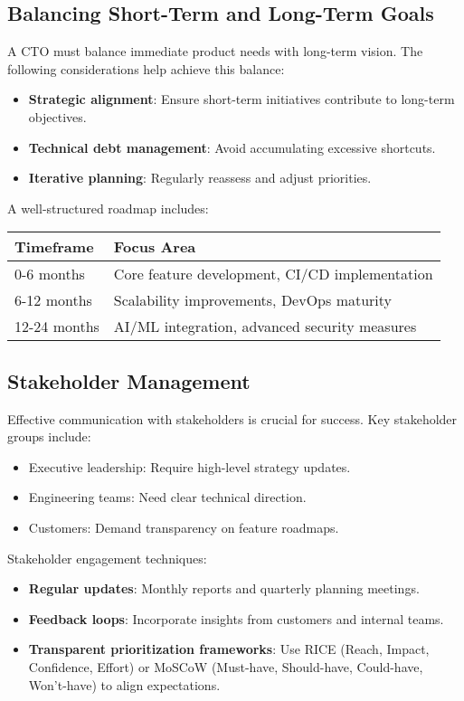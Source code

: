 \subsection{Balancing Short-Term and Long-Term Goals}
A CTO must balance immediate product needs with long-term vision. The following considerations help achieve this balance:

\begin{itemize}
    \item \textbf{Strategic alignment}: Ensure short-term initiatives contribute to long-term objectives.
    \item \textbf{Technical debt management}: Avoid accumulating excessive shortcuts.
    \item \textbf{Iterative planning}: Regularly reassess and adjust priorities.
\end{itemize}
%
A well-structured roadmap includes:\\
%
{\centering
\begin{tabular}{|l|l|}
    \hline
    \textbf{Timeframe} & \textbf{Focus Area}                            \\
    \hline
    0-6 months         & Core feature development, CI/CD implementation \\
    6-12 months        & Scalability improvements, DevOps maturity      \\
    12-24 months       & AI/ML integration, advanced security measures  \\
    \hline
\end{tabular}}

\subsection{Stakeholder Management}
Effective communication with stakeholders is crucial for success. Key stakeholder groups include:

\begin{itemize}
    \item Executive leadership: Require high-level strategy updates.
    \item Engineering teams: Need clear technical direction.
    \item Customers: Demand transparency on feature roadmaps.
\end{itemize}

Stakeholder engagement techniques:
\begin{itemize}
    \item \textbf{Regular updates}: Monthly reports and quarterly planning meetings.
    \item \textbf{Feedback loops}: Incorporate insights from customers and internal teams.
    \item \textbf{Transparent prioritization frameworks}: Use RICE (Reach, Impact, Confidence, Effort) or MoSCoW (Must-have, Should-have, Could-have, Won't-have) to align expectations.
\end{itemize}

